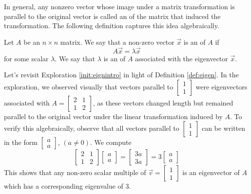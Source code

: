 \documentclass{ximera}
\begin{document}
In general, any nonzero vector whose image under a matrix transformation is parallel to the original vector is called an  of the matrix that induced the transformation.  The following definition captures this idea algebraically.
    
\begin{definition}\label{def:eigen}

Let $A$ be an $n \times n$ matrix.  We say that a non-zero vector $\vec{x}$ is an  of $A$ if $$A\vec{x} = \lambda \vec{x}$$
for some scalar $\lambda$.
We say that $\lambda$ is an  of $A$ associated with the eigenvector $\vec{x}$. 
\end{definition}
    
Let's revisit Exploration \ref{init:eignintro} in light of Definition \ref{def:eigen}.  In the exploration, we observed visually that vectors parallel to $\begin{bmatrix} 1\\ 1 \end{bmatrix}$ were eigenvectors associated with $A=\begin{bmatrix} 2& 1\\ 1&2
\end{bmatrix}$, as these vectors changed length but remained parallel to the original vector under the linear transformation induced by $A$.  To verify this algebraically, observe that all vectors parallel to $\begin{bmatrix} 1\\ 1 \end{bmatrix}$ can be written in the form $\begin{bmatrix} a\\ a \end{bmatrix}$, $(a\neq 0)$.  We compute
$$\begin{bmatrix} 2& 1\\ 1&2 \end{bmatrix} \begin{bmatrix} a\\ a \end{bmatrix} =
\begin{bmatrix} 3a\\ 3a \end{bmatrix}= 3 \begin{bmatrix} a\\ a \end{bmatrix}$$
This shows that any non-zero scalar multiple of $\vec{v}=\begin{bmatrix} 1\\ 1 \end{bmatrix}$ is an eigenvector of $A$ which has a corresponding eigenvalue of 3.
    
\end{document}
